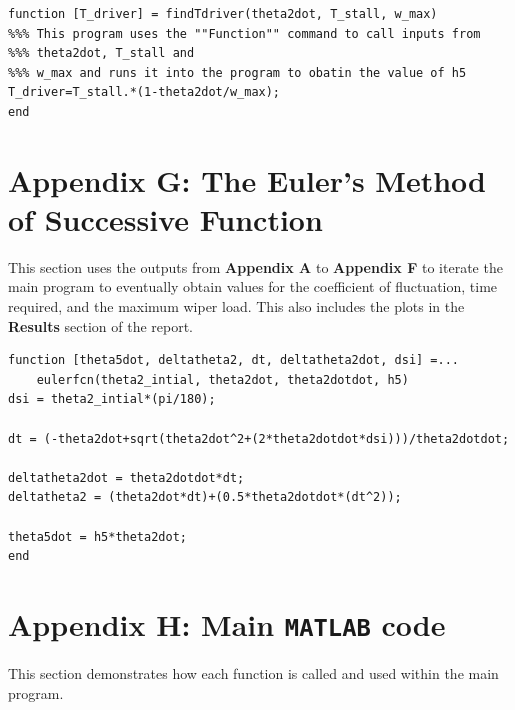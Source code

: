 \documentclass[12pt]{article}
\begin{document}
\begingroup
\fontsize{8pt}{10pt}\selectfont
\begin{verbatim}
function [T_driver] = findTdriver(theta2dot, T_stall, w_max)
%%% This program uses the ""Function"" command to call inputs from 
%%% theta2dot, T_stall and 
%%% w_max and runs it into the program to obatin the value of h5
T_driver=T_stall.*(1-theta2dot/w_max);
end
\end{verbatim}
\endgroup

\newpage
\section*{Appendix G: The Euler's Method of Successive Function}
\begin{doublespace}
This section uses the outputs from {\bf Appendix A} to {\bf Appendix F} to iterate the main program to eventually obtain values for the coefficient of fluctuation, time required, and the maximum wiper load. This also includes the plots in the {\bf Results} section of the report.
\end{doublespace}

\begingroup
\fontsize{8pt}{10pt}\selectfont
\begin{verbatim}
function [theta5dot, deltatheta2, dt, deltatheta2dot, dsi] =...
    eulerfcn(theta2_intial, theta2dot, theta2dotdot, h5)
dsi = theta2_intial*(pi/180);

dt = (-theta2dot+sqrt(theta2dot^2+(2*theta2dotdot*dsi)))/theta2dotdot;

deltatheta2dot = theta2dotdot*dt;
deltatheta2 = (theta2dot*dt)+(0.5*theta2dotdot*(dt^2));

theta5dot = h5*theta2dot;
end
\end{verbatim}
\endgroup

\newpage
\section*{Appendix H: Main {\tt MATLAB} code} 
\begin{doublespace}
This section demonstrates how each function is called and used within the main program.
\end{doublespace}
\end{document}

